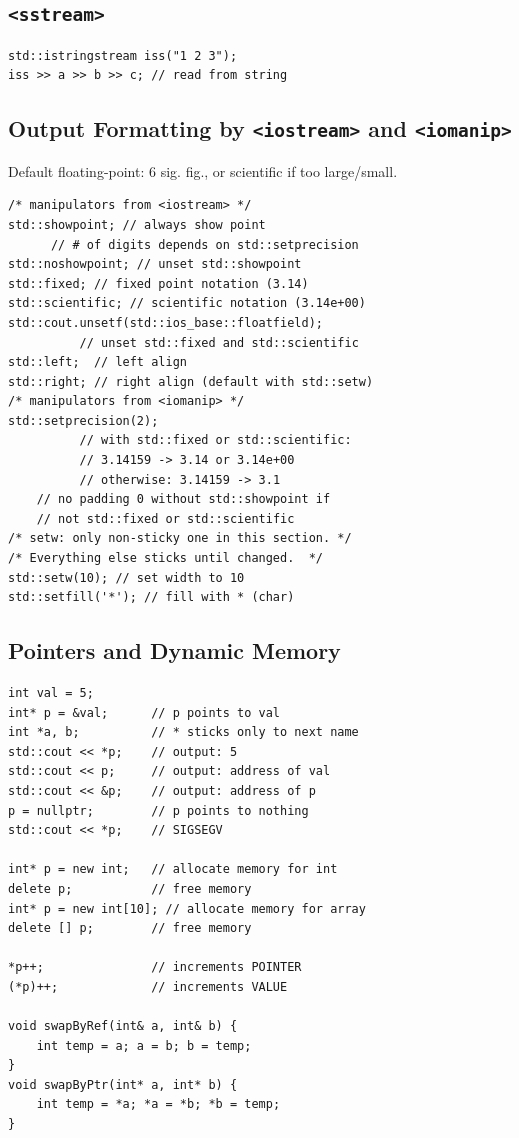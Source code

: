 \subsection*{\texttt{<sstream>}}

\begin{verbatim}
std::istringstream iss("1 2 3");
iss >> a >> b >> c; // read from string
\end{verbatim}
\vspace*{-1.25\baselineskip}

\subsection*{Output Formatting by \texttt{<iostream>} and \texttt{<iomanip>}}

Default floating-point: 6 sig. fig., or scientific if too large/small.
\vspace*{-1.25\baselineskip}
\begin{verbatim}
/* manipulators from <iostream> */
std::showpoint; // always show point
      // # of digits depends on std::setprecision
std::noshowpoint; // unset std::showpoint
std::fixed; // fixed point notation (3.14)
std::scientific; // scientific notation (3.14e+00)
std::cout.unsetf(std::ios_base::floatfield);
          // unset std::fixed and std::scientific
std::left;  // left align
std::right; // right align (default with std::setw)
/* manipulators from <iomanip> */
std::setprecision(2);
          // with std::fixed or std::scientific:
          // 3.14159 -> 3.14 or 3.14e+00
          // otherwise: 3.14159 -> 3.1
    // no padding 0 without std::showpoint if
    // not std::fixed or std::scientific
/* setw: only non-sticky one in this section. */
/* Everything else sticks until changed.  */
std::setw(10); // set width to 10
std::setfill('*'); // fill with * (char)

\end{verbatim}
\vspace*{-1.25\baselineskip}

\subsection*{Pointers and Dynamic Memory}
\begin{verbatim}
int val = 5;
int* p = &val;      // p points to val
int *a, b;          // * sticks only to next name
std::cout << *p;    // output: 5
std::cout << p;     // output: address of val
std::cout << &p;    // output: address of p
p = nullptr;        // p points to nothing
std::cout << *p;    // SIGSEGV

int* p = new int;   // allocate memory for int
delete p;           // free memory
int* p = new int[10]; // allocate memory for array
delete [] p;        // free memory

*p++;               // increments POINTER
(*p)++;             // increments VALUE

void swapByRef(int& a, int& b) {
    int temp = a; a = b; b = temp;
}
void swapByPtr(int* a, int* b) {
    int temp = *a; *a = *b; *b = temp;
}
\end{verbatim}
\vspace*{-1.25\baselineskip}

